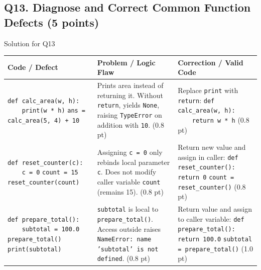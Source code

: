 \documentclass[11pt,a4paper]{article}
\begin{document}
\newpage

\subsection*{Q13. Diagnose and Correct Common Function Defects (5 points)}
\begin{solbox}{Solution for Q13}
\renewcommand{\arraystretch}{1.2}
\small
\begin{tabularx}{\linewidth}{|p{4.2cm}|X|X|}
\hline
\textbf{Code / Defect} & \textbf{Problem / Logic Flaw} & \textbf{Correction / Valid Code} \\
\hline
\texttt{def calc\_area(w, h):}\newline
\texttt{\ \ \ \ print(w * h)}\newline
\texttt{ans = calc\_area(5, 4) + 10} &
Prints area instead of returning it. Without \texttt{return}, yields \texttt{None}, raising \texttt{TypeError} on addition with \texttt{10}. (0.8 pt) &
Replace \texttt{print} with \texttt{return}:\newline
\texttt{def calc\_area(w, h):}\newline
\texttt{\ \ \ \ return w * h}\newline
(0.8 pt) \\
\hline
\texttt{def reset\_counter(c):}\newline
\texttt{\ \ \ \ c = 0}\newline
\texttt{count = 15}\newline
\texttt{reset\_counter(count)} &
Assigning \texttt{c = 0} only rebinds local parameter \texttt{c}. Does not modify caller variable \texttt{count} (remains 15). (0.8 pt) &
Return new value and assign in caller:\newline
\texttt{def reset\_counter(): return 0}\newline
\texttt{count = reset\_counter()}\newline
(0.8 pt) \\
\hline
\texttt{def prepare\_total():}\newline
\texttt{\ \ \ \ subtotal = 100.0}\newline
\texttt{prepare\_total()}\newline
\texttt{print(subtotal)} &
\texttt{subtotal} is local to \texttt{prepare\_total()}. Access outside raises \texttt{NameError: name 'subtotal' is not defined}. (0.8 pt) &
Return value and assign to caller variable:\newline
\texttt{def prepare\_total(): return 100.0}\newline
\texttt{subtotal = prepare\_total()}\newline
(1.0 pt) \\
\hline
\end{tabularx}
\end{solbox}
\end{document}
